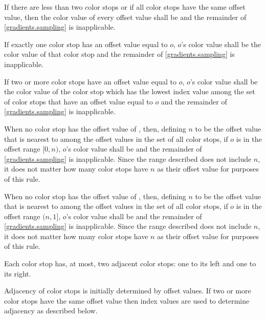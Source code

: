 \begin{enumeratea}
\item If there are less than two color stops or if all color stops have the same offset value, then the color value of every offset value shall be  and the remainder of \ref{gradients.sampling} is inapplicable.

\item If exactly one color stop has an offset value equal to $o$, $o$'s color value shall be the color value of that color stop and the remainder of \ref{gradients.sampling} is inapplicable.

\item If two or more color stops have an offset value equal to $o$, $o$'s color value shall be the color value of the color stop which has the lowest index value among the set of color stops that have an offset value equal to $o$ and the remainder of \ref{gradients.sampling} is inapplicable.

\item When no color stop has the offset value of , then, defining $n$ to be the offset value that is nearest to  among the offset values in the set of all color stops, if $o$ is in the offset range $[0, n)$, $o$'s color value shall be  and the remainder of \ref{gradients.sampling} is inapplicable.
\enternote
Since the range described does not include $n$, it does not matter how many color stops have $n$ as their offset value for purposes of this rule.
\exitnote

\item When no color stop has the offset value of , then, defining $n$ to be the offset value that is nearest to  among the offset values in the set of all color stops, if $o$ is in the offset range $(n, 1]$, $o$'s color value shall be  and the remainder of \ref{gradients.sampling} is inapplicable.
\enternote
Since the range described does not include $n$, it does not matter how many color stops have $n$ as their offset value for purposes of this rule.
\exitnote

\item Each color stop has, at most, two adjacent color stops: one to its left and one to its right.

\item Adjacency of color stops is initially determined by offset values. If two or more color stops have the same offset value then index values are used to determine adjacency as described below.


\end{enumeratea}
